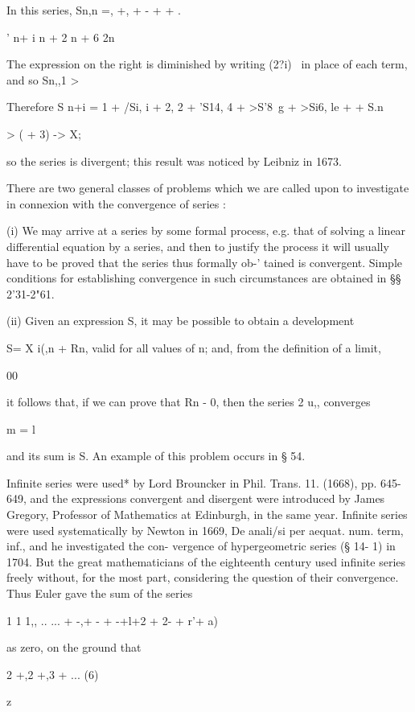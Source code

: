 In this series, Sn,n =, +, + - +  + . 

' n+ i n + 2 n + 6 2n

The expression on the right is diminished by writing (2?i)~ in place
of each term, and so Sn,,1 > 

%
%

Therefore S n+i = 1 + /Si, i + 2, 2 + 'S14, 4 + >S'8\ g + >Si6, le + 
  + S.n 

> ( + 3) -> X;

so the series is divergent; this result was noticed by Leibniz in
1673.

There are two general classes of problems which we are called upon to
investigate in connexion with the convergence of series :

(i) We may arrive at a series by some formal process, e.g. that of
solving a linear differential equation by a series, and then to
justify the process it will usually have to be proved that the series
thus formally ob-' tained is convergent. Simple conditions for
establishing convergence in such circumstances are obtained in §§
2'31-2"61.

(ii) Given an expression S, it may be possible to obtain a development

S= X i(,n + Rn, valid for all values of n; and, from the definition
of a limit,

00

it follows that, if we can prove that Rn - 0, then the series 2 u,,
converges

m = l

and its sum is S. An example of this problem occurs in § 54.

Infinite series were used* by Lord Brouncker in Phil. Trans. 11.
(1668), pp. 645-649, and the expressions convergent and disergent were
introduced by James Gregory, Professor of Mathematics at Edinburgh, in
the same year. Infinite series were used systematically by Newton in
1669, De anali/si per aequat. num. term, inf., and he investigated the
con- vergence of hypergeometric series (§ 14- 1) in 1704. But the
great mathematicians of the eighteenth century used infinite series
freely without, for the most part, considering the question of their
convergence. Thus Euler gave the sum of the series

1 1 1,, .. ... + -,+ - + -+l+2 + 2- + r'+ a)

as zero, on the ground that

2 +,2 +,3 + ... (6)

\-z

